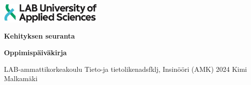 \documentclass[11pt,a4paper,titlepage,oneside]{article}
\renewcommand{\baselinestretch}{1.5}
\begin{document}
\pagestyle{empty}



\includegraphics[width=5cm,height=1cm]{./src/labimg.jpg}

\renewcommand{\baselinestretch}{1} 
\setlength{\parskip}{0cm}

\vspace{86mm}
{\huge
\textbf{Kehityksen seuranta}
}
\newline

{\large

\vspace{5mm}
\textbf{Oppimispäiväkirja}
}

\vspace{90mm}

LAB-ammattikorkeakoulu \newline
\vspace{2mm}
Tieto-ja tietolikenadsfklj, Insinööri (AMK) \newline
\vspace{2mm}
2024 \newline
\vspace{2mm}
Kimi Malkamäki

\newpage

\renewcommand{\baselinestretch}{1.5} 
\setlength{\parskip}{0.1cm}
\end{document}
